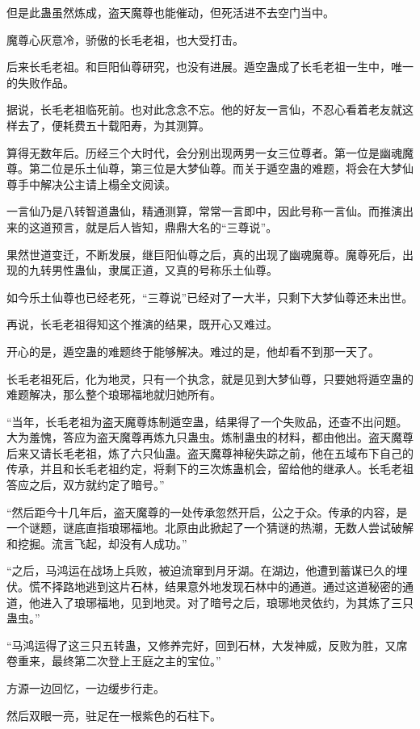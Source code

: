 \begin{this_body}
但是此蛊虽然炼成，盗天魔尊也能催动，但死活进不去空门当中。

魔尊心灰意冷，骄傲的长毛老祖，也大受打击。

后来长毛老祖。和巨阳仙尊研究，也没有进展。遁空蛊成了长毛老祖一生中，唯一的失败作品。

据说，长毛老祖临死前。也对此念念不忘。他的好友一言仙，不忍心看着老友就这样去了，便耗费五十载阳寿，为其测算。

算得无数年后。历经三个大时代，会分别出现两男一女三位尊者。第一位是幽魂魔尊。第二位是乐土仙尊，第三位是大梦仙尊。而关于遁空蛊的难题，将会在大梦仙尊手中解决公主请上榻全文阅读。

一言仙乃是八转智道蛊仙，精通测算，常常一言即中，因此号称一言仙。而推演出来的这道预言，就是后人皆知，鼎鼎大名的“三尊说”。

果然世道变迁，不断发展，继巨阳仙尊之后，真的出现了幽魂魔尊。魔尊死后，出现的九转男性蛊仙，隶属正道，又真的号称乐土仙尊。

如今乐土仙尊也已经老死，“三尊说”已经对了一大半，只剩下大梦仙尊还未出世。

再说，长毛老祖得知这个推演的结果，既开心又难过。

开心的是，遁空蛊的难题终于能够解决。难过的是，他却看不到那一天了。

长毛老祖死后，化为地灵，只有一个执念，就是见到大梦仙尊，只要她将遁空蛊的难题解决，那么整个琅琊福地就归她所有。

“当年，长毛老祖为盗天魔尊炼制遁空蛊，结果得了一个失败品，还查不出问题。大为羞愧，答应为盗天魔尊再炼九只蛊虫。炼制蛊虫的材料，都由他出。盗天魔尊后来又请长毛老祖，炼了六只仙蛊。盗天魔尊神秘失踪之前，他在五域布下自己的传承，并且和长毛老祖约定，将剩下的三次炼蛊机会，留给他的继承人。长毛老祖答应之后，双方就约定了暗号。”

“然后距今十几年后，盗天魔尊的一处传承忽然开启，公之于众。传承的内容，是一个谜题，谜底直指琅琊福地。北原由此掀起了一个猜谜的热潮，无数人尝试破解和挖掘。流言飞起，却没有人成功。”

“之后，马鸿运在战场上兵败，被迫流窜到月牙湖。在湖边，他遭到蓄谋已久的埋伏。慌不择路地逃到这片石林，结果意外地发现石林中的通道。通过这道秘密的通道，他进入了琅琊福地，见到地灵。对了暗号之后，琅琊地灵依约，为其炼了三只蛊虫。”

“马鸿运得了这三只五转蛊，又修养完好，回到石林，大发神威，反败为胜，又席卷重来，最终第二次登上王庭之主的宝位。”

方源一边回忆，一边缓步行走。

然后双眼一亮，驻足在一根紫色的石柱下。


\end{this_body}
